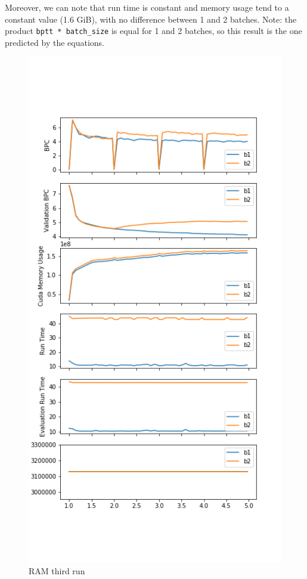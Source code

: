 Moreover, we can note that run time is constant and memory usage tend to
a constant value (1.6 GiB), with no difference between 1 and 2 batches.
Note: the product \lstinline!bptt * batch_size! is equal for 1 and 2
batches, so this result is the one predicted by the equations.

\begin{figure}[h]
\centering
\includegraphics{parts/appendix/reports-gmsnn/docs_esteban-latex/test_reports/2018-06-13/batch_1_2_frac.png}
\caption{RAM third run}
\end{figure}


